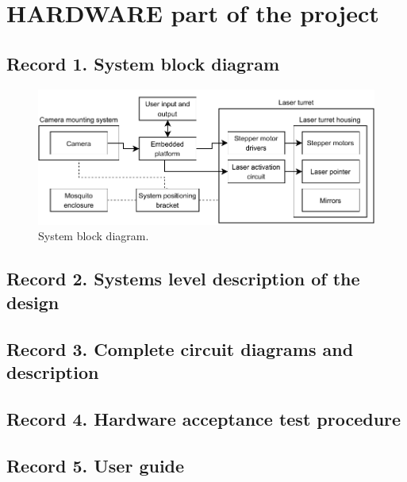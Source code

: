 
\section{HARDWARE part of the project}

\subsection{Record 1. System block diagram}
\begin{figure}[H]
  \centering
  \includegraphics[width=\textwidth]{figures/hardware_block_diagram.pdf}
  \caption{System block diagram.}
\end{figure}


\subsection{Record 2.  Systems level description of the design}


\subsection{Record 3. Complete circuit diagrams and description}


\subsection{Record 4. Hardware acceptance test procedure}


\subsection{Record 5. User guide}



